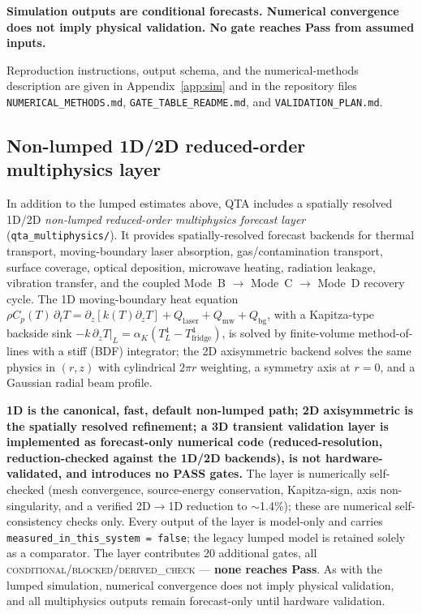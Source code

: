 \documentclass[12pt,a4paper]{article}
\newcommand{\blocked}{\textsc{blocked}}
\newcommand{\conditional}{\textsc{conditional}}
\newcommand{\derivedcheck}{\textsc{derived\_check}}
\begin{document}
\textbf{Simulation outputs are conditional forecasts.
Numerical convergence does not imply physical validation.
No gate reaches Pass from assumed inputs.}

Reproduction instructions, output schema, and the numerical-methods description are
given in Appendix~\ref{app:sim} and in the repository files
\texttt{NUMERICAL\_METHODS.md}, \texttt{GATE\_TABLE\_README.md}, and
\texttt{VALIDATION\_PLAN.md}.

\subsection{Non-lumped 1D/2D reduced-order multiphysics layer}
\label{sec:multiphysics}

In addition to the lumped estimates above, QTA includes a spatially resolved 1D/2D
\emph{non-lumped reduced-order multiphysics forecast layer}
(\texttt{qta\_multiphysics/}). It provides spatially-resolved forecast backends
for thermal transport, moving-boundary laser absorption, gas/contamination
transport, surface coverage, optical deposition, microwave heating, radiation
leakage, vibration transfer, and the coupled Mode~B $\rightarrow$ Mode~C
$\rightarrow$ Mode~D recovery cycle. The 1D moving-boundary heat equation
$\rho C_p(T)\,\partial_t T = \partial_z[k(T)\partial_z T] + Q_\mathrm{laser} +
Q_\mathrm{mw} + Q_\mathrm{bg}$, with a Kapitza-type backside sink
$-k\,\partial_z T|_L = \alpha_K(T_L^4 - T_\mathrm{fridge}^4)$, is solved by
finite-volume method-of-lines with a stiff (BDF) integrator; the 2D axisymmetric
backend solves the same physics in $(r,z)$ with cylindrical $2\pi r$ weighting, a
symmetry axis at $r=0$, and a Gaussian radial beam profile.

\textbf{1D is the canonical, fast, default non-lumped path; 2D axisymmetric is the
spatially resolved refinement; a 3D transient validation layer is implemented as
forecast-only numerical code (reduced-resolution, reduction-checked against the
1D/2D backends), is not hardware-validated, and introduces no PASS gates.} The layer is numerically self-checked (mesh convergence,
source-energy conservation, Kapitza-sign, axis non-singularity, and a verified
2D$\rightarrow$1D reduction to $\sim$1.4\%); these are numerical
self-consistency checks only. Every output of the layer is model-only and carries
\texttt{measured\_in\_this\_system = false}; the legacy lumped model is retained
solely as a comparator. The layer contributes 20 additional gates, all
\conditional{}/\blocked{}/\derivedcheck{} --- \textbf{none reaches Pass}. As with
the lumped simulation, numerical convergence does not imply physical validation,
and all multiphysics outputs remain forecast-only until hardware validation.
\end{document}
